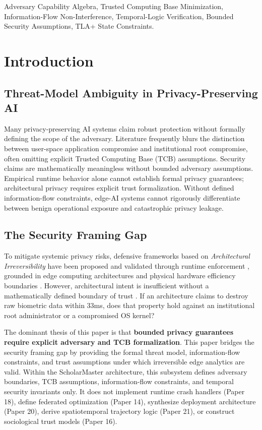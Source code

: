 \documentclass[conference]{IEEEtran}
\begin{document}
\begin{IEEEkeywords}
Adversary Capability Algebra, Trusted Computing Base Minimization, Information-Flow Non-Interference, Temporal-Logic Verification, Bounded Security Assumptions, TLA+ State Constraints.
\end{IEEEkeywords}

\section{Introduction}

\subsection{Threat-Model Ambiguity in Privacy-Preserving AI}
Many privacy-preserving AI systems claim robust protection without formally defining the scope of the adversary. Literature frequently blurs the distinction between user-space application compromise and institutional root compromise, often omitting explicit Trusted Computing Base (TCB) assumptions. Security claims are mathematically meaningless without bounded adversary assumptions. Empirical runtime behavior alone cannot establish formal privacy guarantees; architectural privacy requires explicit trust formalization. Without defined information-flow constraints, edge-AI systems cannot rigorously differentiate between benign operational exposure and catastrophic privacy leakage.

\subsection{The Security Framing Gap}
To mitigate systemic privacy risks, defensive frameworks based on \textit{Architectural Irreversibility} \cite{b1} have been proposed and validated through runtime enforcement \cite{b30_cps}, grounded in edge computing architectures \cite{b6, b25, b26} and physical hardware efficiency boundaries \cite{b24}. However, architectural intent is insufficient without a mathematically defined boundary of trust \cite{b1}. If an architecture claims to destroy raw biometric data within $33$ms, does that property hold against an institutional root administrator or a compromised OS kernel?

The dominant thesis of this paper is that \textbf{bounded privacy guarantees require explicit adversary and TCB formalization}. This paper bridges the security framing gap by providing the formal threat model, information-flow constraints, and trust assumptions under which irreversible edge analytics are valid. Within the ScholarMaster architecture, this subsystem defines adversary boundaries, TCB assumptions, information-flow constraints, and temporal security invariants only. It does not implement runtime crash handlers (Paper 18), define federated optimization \cite{b15} (Paper 14), synthesize deployment architecture (Paper 20), derive spatiotemporal trajectory logic \cite{b7} (Paper 21), or construct sociological trust models (Paper 16).
\end{document}

